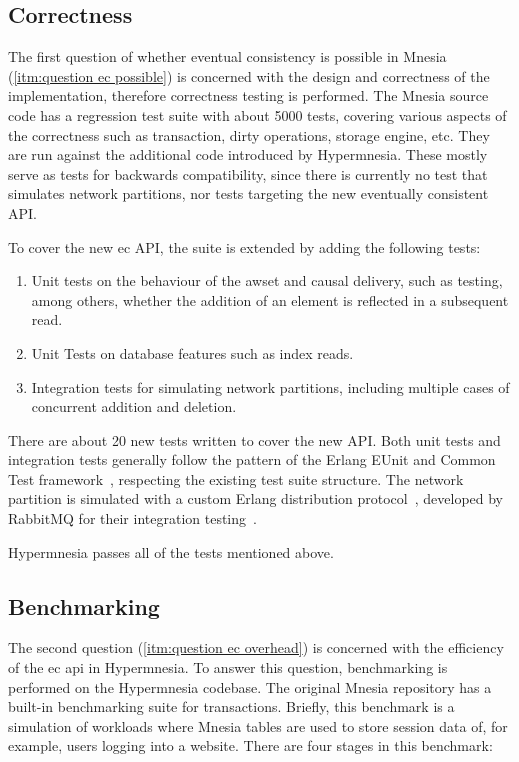 \subsection{Correctness} \label{sec:eval correctness}

The first question of whether eventual consistency is possible in 
Mnesia (\cref{itm:question ec possible}) is
concerned with the design and correctness of the implementation, therefore
correctness testing is performed.
The Mnesia source code has a regression test suite with about 5000 tests, 
covering various aspects of the correctness such as transaction, 
dirty operations, storage engine, etc. They are
run against the additional code introduced by Hypermnesia. These
mostly serve as tests for backwards compatibility, since there is currently no 
test that simulates network partitions, nor tests targeting the new eventually 
consistent API\@.

To cover the new \acrshort{ec} API, the suite is extended by
adding the following tests:

\begin{enumerate}
  \item Unit tests on the behaviour of the \acrshort{awset}
  and causal delivery, such as testing, among others, whether the addition of an 
  element is reflected in a subsequent read.
  \item Unit Tests on database features such as index reads.
  \item Integration tests for simulating network partitions, including multiple 
  cases of concurrent addition and deletion.
\end{enumerate}

There are about 20 new tests written to cover the new API. 
Both unit tests and integration tests generally follow the pattern of the Erlang
EUnit and Common Test framework~\cite{ericssonab2023eunit,ericssonab2023ct},
respecting the existing test suite structure. The network partition is simulated with
a custom Erlang distribution protocol~\cite{ericssonab2023erldistro}, 
developed by RabbitMQ for their integration testing~\cite{rabbitmq2022inet_tcp_proxy}.

Hypermnesia passes all of the tests mentioned above.

\subsection{Benchmarking} \label{sec:eval benchmarks}


The second question (\cref{itm:question ec overhead}) 
is concerned with the efficiency of the \acrlong{ec} \acrshort{api} in Hypermnesia. 
To answer this question, benchmarking is performed on the Hypermnesia codebase.
The original Mnesia repository has a built-in benchmarking suite for transactions. 
Briefly, this benchmark is a
simulation of workloads where Mnesia tables are used to store session data of,
for example, users logging into a website. There are four stages in this benchmark:

